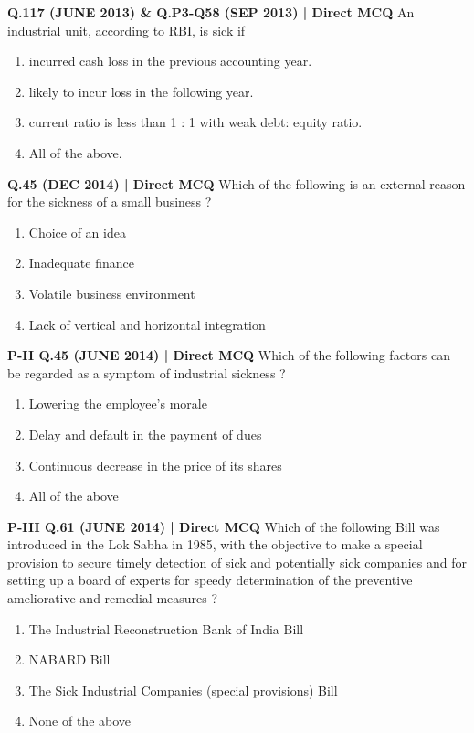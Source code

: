 \documentclass{article}
\begin{document}
\textbf{Q.117 (JUNE 2013) \& Q.P3-Q58 (SEP 2013) | Direct MCQ}
An industrial unit, according to RBI, is sick if
\begin{enumerate}[label=(\arabic*)]
    \item incurred cash loss in the previous accounting year.
    \item likely to incur loss in the following year.
    \item current ratio is less than 1 : 1 with weak debt: equity ratio.
    \item All of the above.
\end{enumerate}

\textbf{Q.45 (DEC 2014) | Direct MCQ}
Which of the following is an external reason for the sickness of a small business ?
\begin{enumerate}[label=(\arabic*)]
    \item Choice of an idea
    \item Inadequate finance
    \item Volatile business environment
    \item Lack of vertical and horizontal integration
\Hfill
\end{enumerate}

\textbf{P-II Q.45 (JUNE 2014) | Direct MCQ}
Which of the following factors can be regarded as a symptom of industrial sickness ?
\begin{enumerate}[label=(\arabic*)]
    \item Lowering the employee’s morale
    \item Delay and default in the payment of dues
    \item Continuous decrease in the price of its shares
    \item All of the above
\end{enumerate}

\textbf{P-III Q.61 (JUNE 2014) | Direct MCQ}
Which of the following Bill was introduced in the Lok Sabha in 1985, with the objective to make a special provision to secure timely detection of sick and potentially sick companies and for setting up a board of experts for speedy determination of the preventive ameliorative and remedial measures ?
\begin{enumerate}[label=(\arabic*)]
    \item The Industrial Reconstruction Bank of India Bill
    \item NABARD Bill
    \item The Sick Industrial Companies (special provisions) Bill
    \item None of the above
\end{enumerate}
\end{document}
